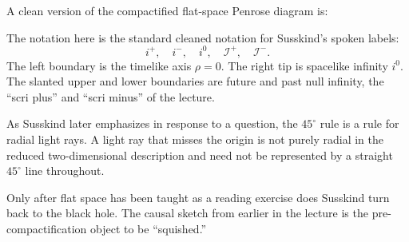A clean version of the compactified flat-space Penrose diagram is:

\begin{figure}[h]
\centering
{}
\end{figure}

The notation here is the standard cleaned notation for Susskind's spoken labels:
\begin{equation}
i^+,\quad i^-,\quad i^0,\quad \mathscr{I}^+,\quad \mathscr{I}^-.
\end{equation}
The left boundary is the timelike axis \(\rho=0\). The right tip is spacelike infinity \(i^0\). The slanted upper and lower boundaries are future and past null infinity, the ``scri plus'' and ``scri minus'' of the lecture.

\begin{remark}
As Susskind later emphasizes in response to a question, the \(45^\circ\) rule is a rule for radial light rays. A light ray that misses the origin is not purely radial in the reduced two-dimensional description and need not be represented by a straight \(45^\circ\) line throughout.
\end{remark}

Only after flat space has been taught as a reading exercise does Susskind turn back to the black hole. The causal sketch from earlier in the lecture is the pre-compactification object to be ``squished.''

